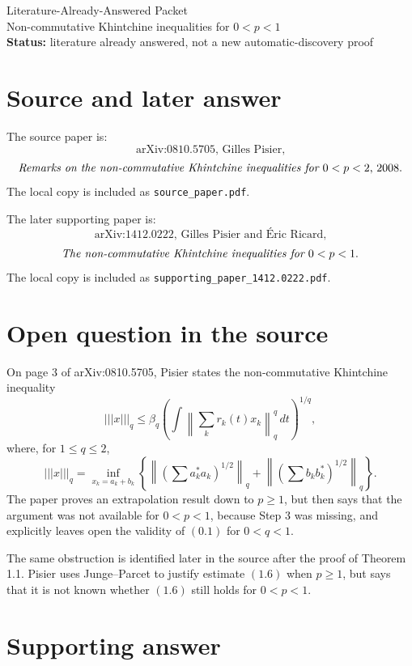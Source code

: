 \documentclass[11pt]{article}
\begin{document}
\begin{center}
{\Large Literature-Already-Answered Packet}\\[0.25em]
{\large Non-commutative Khintchine inequalities for \(0<p<1\)}\\[0.35em]
\textbf{Status:} literature already answered, not a new automatic-discovery proof
\end{center}

\section*{Source and later answer}

The source paper is:
\[
\text{arXiv:0810.5705, Gilles Pisier,}
\]
\[
\text{\emph{Remarks on the non-commutative Khintchine inequalities for \(0<p<2\)}, 2008.}
\]
The local copy is included as \texttt{source\_paper.pdf}.

The later supporting paper is:
\[
\text{arXiv:1412.0222, Gilles Pisier and \'{E}ric Ricard,}
\]
\[
\text{\emph{The non-commutative Khintchine inequalities for \(0<p<1\)}.}
\]
The local copy is included as \texttt{supporting\_paper\_1412.0222.pdf}.

\section*{Open question in the source}

On page 3 of arXiv:0810.5705, Pisier states the non-commutative
Khintchine inequality
\[
 |||x|||_q \le \beta_q
\left(\int\left\|\sum_k r_k(t)x_k\right\|_q^q\,dt\right)^{1/q},
\tag{0.1}
\]
where, for \(1\le q\le 2\),
\[
|||x|||_q =
\inf_{x_k=a_k+b_k}
\left\{
\left\|\left(\sum a_k^*a_k\right)^{1/2}\right\|_q+
\left\|\left(\sum b_kb_k^*\right)^{1/2}\right\|_q
\right\}.
\]
The paper proves an extrapolation result down to \(p\ge 1\), but then says
that the argument was not available for \(0<p<1\), because Step 3 was missing,
and explicitly leaves open the validity of \((0.1)\) for \(0<q<1\).

The same obstruction is identified later in the source after the proof of
Theorem 1.1. Pisier uses Junge--Parcet to justify estimate \((1.6)\) when
\(p\ge 1\), but says that it is not known whether \((1.6)\) still holds for
\(0<p<1\).

\section*{Supporting answer}
\end{document}
